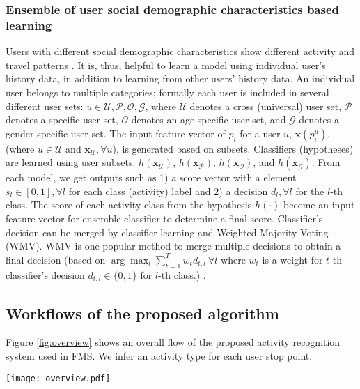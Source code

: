 \documentclass{sig-alternate}
\begin{document}
\subsubsection{Ensemble of user social demographic characteristics based learning}
Users with different social demographic characteristics show different activity and travel patterns \cite{Jiang2012Clustering,Kwan1999Gender}. It is, thus, helpful to learn a model using individual user's history data, in addition to learning from other users' history data. An individual user belongs to multiple categories; formally each user is included in several different user sets: $u \in \mathcal{U}, \mathcal{P}, \mathcal{O}, \mathcal{G}$, where $\mathcal{U}$ denotes a cross (universal) user set, $\mathcal{P}$ denotes a specific user set, $\mathcal{O}$ denotes an age-specific user set, and $\mathcal{G}$ denotes a gender-specific user set. The input feature vector of $p_i$ for a user $u$, $\mathbf{x}({p_i^u})$, (where $u \in {\mathcal{U}}$ and $\mathbf{x}_{\mathcal{U}}, \forall u$), is generated based on subsets. Classifiers (hypotheses) are learned using user subsets: $h(\mathbf{x}_{\mathcal{U}})$, $h(\mathbf{x}_{\mathcal{P}})$, $h(\mathbf{x}_{\mathcal{O}})$, and $h(\mathbf{x}_{\mathcal{G}})$. From each model, we get outputs such as 1) a score vector with a element $s_l \in [0, 1], \forall l$ for each class (activity) label and 2) a decision $d_{l}, \forall l$ for the $l$-th class. The score of each activity class from the hypothesis $h(\cdot)$ become an input feature vector for ensemble classifier to determine a final score. Classifier's decision can be merged by classifier learning and Weighted Majority Voting (WMV). WMV is one popular method to merge multiple decisions to obtain a final decision (based on $\arg\max_l  \sum_{t=1}^T w_{t}d_{t,l}~\forall l$ where  $w_{t}$ is a weight for $t$-th classifier's decision $d_{t,l} \in \{0,1\}$ for $l$-th class.) \cite{Polikar2006Ensemble}.



\subsection{Workflows of the proposed algorithm}
Figure \ref{fig:overview} shows an overall flow of the proposed activity recognition system used in FMS. We infer an activity type for each user stop point.


\begin{figure*}[tb]
        \centering
\texttt{[image: overview.pdf]}
        \caption{Overview of the proposed activity recognition system. Based on given an identified stop (detected by the current stop detection algorithm), the algorithm identifies an activity based on spatial, temporal, transition, and contextual features. We assume that his/her home location is known beforehand (provided when he/she registered in the website).    }
        \label{fig:overview}\end{figure*}
\end{document}
